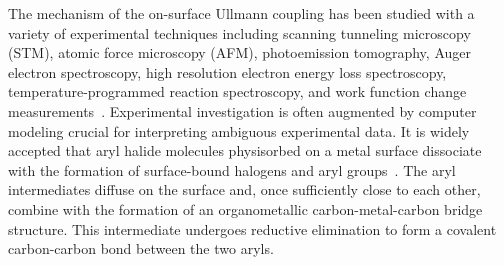 \documentclass[aps,prb,amsmath,amssymb,11pt]{revtex4-1}
\newcommand{\sinfo}{Supporting Information}
\begin{document}

The mechanism of the on-surface Ullmann coupling has been studied with a variety of experimental techniques including scanning tunneling microscopy (STM), atomic force microscopy (AFM), photoemission tomography, Auger electron spectroscopy, high resolution electron energy loss spectroscopy, temperature-programmed reaction spectroscopy, and work function change measurements~\cite{ullmann_143, sur_sci01, ullmann_141, ullmann_142, ullmann_87, sur_sci02, ullmann_144}. Experimental investigation is often augmented by computer modeling crucial for interpreting ambiguous experimental data.
%
%
%
It is widely accepted that aryl halide molecules physisorbed on a metal surface dissociate with the formation of surface-bound halogens and aryl groups~\cite{ullmann_145, sur_sci01, ullmann_87, sur_sci03}. The aryl intermediates diffuse on the surface and, once sufficiently close to each other, combine with the formation of an organometallic carbon-metal-carbon bridge structure. This intermediate undergoes reductive elimination to form a covalent carbon-carbon bond between the two aryls. %

\end{document}
